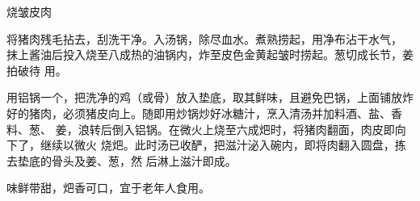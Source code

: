 \begin{recipe}{烧皱皮肉}

\ingredients


\preparation

\step 将猪肉残毛拈去，刮洗干净。入汤锅，除尽血水。煮熟捞起，用净布沾干水气，
抹上酱油后投入烧至八成热的油锅内，炸至皮色金黄起皱时捞起。葱切成长节，姜拍破待
用。

\step 用铝锅一个，把洗净的鸡（或骨）放入垫底，取其鲜味，且避免巴锅，上面铺放炸
好的猪肉，必须猪皮向上。随即用炒锅炒好冰糖汁，烹入清汤并加料酒、盐、香料、葱、
姜，浪转后倒入铝锅。在微火上烧至六成𤆵时，将猪肉翻面，肉皮即向下了，继续以微火
烧𤆵。此时汤已收酽，把滋汁泌入碗内，即将肉翻入圆盘，拣去垫底的骨头及姜、葱，然
后淋上滋汁即成。

\features

味鲜带甜，𤆵香可口，宜于老年人食用。

\end{recipe}


